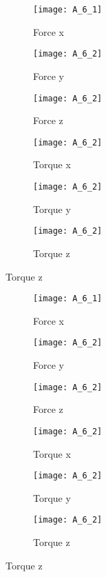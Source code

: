 \begin{figure}[H]
  \caption{Sinusoidal contact force}  
  \begin{subfigure}[t]{0.5\textwidth}
    \centering
    \texttt{[image: A\_6\_1]} 
    \caption{Force x}
  \end{subfigure}
  \begin{subfigure}[t]{0.5\textwidth}
    \centering
    \texttt{[image: A\_6\_2]}
    \caption{Force y}
  \end{subfigure}
  \begin{subfigure}[t]{0.5\textwidth}
    \centering
    \texttt{[image: A\_6\_2]}
    \caption{Force z}
  \end{subfigure}
  \begin{subfigure}[t]{0.5\textwidth}
    \centering
    \texttt{[image: A\_6\_2]}
    \caption{Torque x}
  \end{subfigure}
  \begin{subfigure}[t]{0.5\textwidth}
    \centering
    \texttt{[image: A\_6\_2]}
    \caption{Torque y}
  \end{subfigure}
  \begin{subfigure}[t]{0.5\textwidth}
    \centering
    \texttt{[image: A\_6\_2]}
    \caption{Torque z}
  \end{subfigure}
\end{figure}

\begin{figure}[H]
  \caption{Step function contact force} 
  \label{fig:appendix step contact} 
  \begin{subfigure}[t]{0.5\textwidth}
    \centering
    \texttt{[image: A\_6\_1]} 
    \caption{Force x}
  \end{subfigure}
  \begin{subfigure}[t]{0.5\textwidth}
    \centering
    \texttt{[image: A\_6\_2]}
    \caption{Force y}
  \end{subfigure}
  \begin{subfigure}[t]{0.5\textwidth}
    \centering
    \texttt{[image: A\_6\_2]}
    \caption{Force z}
  \end{subfigure}
  \begin{subfigure}[t]{0.5\textwidth}
    \centering
    \texttt{[image: A\_6\_2]}
    \caption{Torque x}
  \end{subfigure}
  \begin{subfigure}[t]{0.5\textwidth}
    \centering
    \texttt{[image: A\_6\_2]}
    \caption{Torque y}
  \end{subfigure}
  \begin{subfigure}[t]{0.5\textwidth}
    \centering
    \texttt{[image: A\_6\_2]}
    \caption{Torque z}
  \end{subfigure}
\end{figure}
